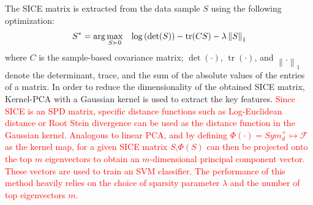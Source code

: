 \documentclass[journal]{IEEEtran}
\newcommand\norm[1]{\left\lVert#1\right\rVert}
\begin{document}
	The SICE matrix is extracted from the data sample $S$ using the following optimization: 
	\begin{align}
	S^* = \operatorname{arg} \max\limits_{S\succ 0} \hspace{3mm} \log \left( \det(S) \right) - \operatorname{tr}(CS) - \lambda \norm{S}_1
	\end{align}
	where $C$ is the sample-based covariance matrix; $\det(·)$, $\operatorname{tr}(·)$,
	and $\norm{.}_1$ denote the determinant, trace, and the sum of the absolute values of the entries of a matrix. 
In order to reduce the dimensionality of the obtained SICE matrix, Kernel-PCA with a Gaussian kernel is used  to extract the key features.
	\textcolor{red}{Since SICE is an SPD matrix, specific distance functions such as Log-Euclidean distance\cite{r49} or Root Stein divergence\cite{r50} can be used as the distance function in the Gaussian kernel. Analogous to linear PCA, and by defining 
	$\Phi(\cdot) = Sym^{+}_{d} \mapsto \mathcal{F}$ as the kernel map, 
	 for a given SICE matrix $S$,$\Phi(S)$ can then be projected onto the top $m$ eigenvectors to obtain an $m$-dimensional principal
	component vector. These vectors are used to train an SVM classifier. The performance of this method heavily relies on the choice of sparsity parameter $\lambda$ and the number of top eigenvectors $m$. }   
	
\end{document}

